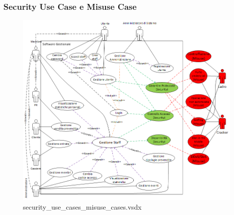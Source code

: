 \documentclass[a4paper]{article}
\begin{document}
\subsubsection{Security Use Case e Misuse Case}


\begin{figure}[H]
    \includegraphics[scale=0.75]{Analisi/Cases/security_use_cases_misuse_cases.png}
    \centering
    \caption{security\_use\_cases\_misuse\_cases.vsdx}
\end{figure}

\newpage
\end{document}
